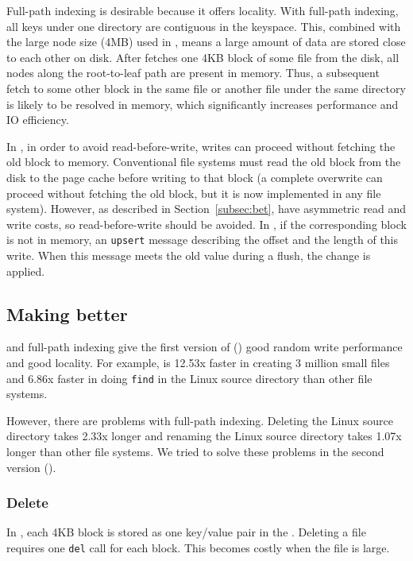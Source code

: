 Full-path indexing is desirable because it offers locality.
With full-path indexing, all keys under one directory are contiguous in the
keyspace.
This, combined with the large node size (4MB) used in \bets, means a large
amount of data are stored close to each other on disk.
After \betrfs fetches one 4KB block of some file from the disk, all nodes along
the root-to-leaf path are present in memory.
Thus, a subsequent fetch to some other block in the same file or another
file under the same directory is likely to be resolved in memory, which
significantly increases performance and IO efficiency.

In \betrfs, in order to avoid read-before-write, writes can proceed without
fetching the old block to memory.
Conventional file systems must read the old block from the disk to the page
cache before writing to that block (a complete overwrite can proceed without
fetching the old block, but it is now implemented in any file system).
However, as described in Section~\ref{subsec:bet}, \bets have asymmetric read
and write costs, so read-before-write should be avoided.
In \betrfs, if the corresponding block is not in memory, an \texttt{upsert}
message describing the offset and the length of this write.
When this message meets the old value during a flush, the change is applied.

\subsection{Making \betrfs better}

\bets and full-path indexing give the first version of \betrfs (\betrfsOne)
good random write performance and good locality.
For example, \betrfsOne is 12.53x faster in creating 3 million small files and
6.86x faster in doing \texttt{find} in the Linux source directory than other
file systems.

However, there are problems with full-path indexing.
Deleting the Linux source directory takes 2.33x longer and renaming the Linux
source directory takes 1.07x longer than other file systems.
We tried to solve these problems in the second version (\betrfsTwo).

\subsubsection{Delete}
In \betrfsOne, each 4KB block is stored as one key/value pair in the \bet.
Deleting a file requires one \texttt{del} call for each block.
This becomes costly when the file is large.

